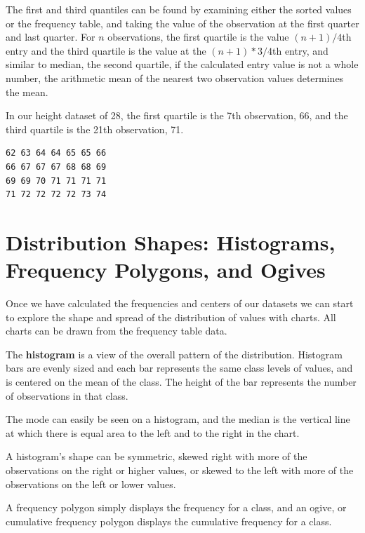 \documentclass[nohyper,justified]{tufte-handout}\usepackage[]{graphicx}\usepackage[]{color}
\makeatletter
\newenvironment{kframe}{%
 \def\at@end@of@kframe{}%
 \ifinner\ifhmode%
  \def\at@end@of@kframe{\end{minipage}}%
  \begin{minipage}{\columnwidth}%
 \fi\fi%
 \def\FrameCommand##1{\hskip\@totalleftmargin \hskip-\fboxsep
 \colorbox{shadecolor}{##1}\hskip-\fboxsep
     \hskip-\linewidth \hskip-\@totalleftmargin \hskip\columnwidth}%
 \MakeFramed {\advance\hsize-\width
   \@totalleftmargin\z@ \linewidth\hsize
   \@setminipage}}%
 {\par\unskip\endMakeFramed%
 \at@end@of@kframe}
\newenvironment{knitrout}{}{} %
\makeatother
\begin{document}
The first and third quantiles can be found by examining either the sorted values or the frequency table, and taking the value of the observation at the first quarter and last quarter. For $n$ observations, the first quartile is the value $(n+1)/4$th entry and the third quartile is the value at the $(n+1)*3/4$th entry, and similar to median, the second quartile, if the calculated entry value is not a whole number, the arithmetic mean of the nearest two observation values determines the mean.



In our height dataset of 28, the first quartile is the 7th observation, 66, and the third quartile is the 21th observation, 71.
\begin{knitrout}
\color{fgcolor}\begin{kframe}
\begin{verbatim}
62 63 64 64 65 65 66
66 67 67 67 68 68 69
69 69 70 71 71 71 71
71 72 72 72 72 73 74
\end{verbatim}
\end{kframe}
\end{knitrout}


\section{Distribution Shapes: Histograms, Frequency Polygons, and Ogives}

Once we have calculated the frequencies and centers of our datasets we can start to explore the shape and spread of the distribution of values with charts. All charts can be drawn from the frequency table data.

The \textbf{histogram} is a view of the overall pattern of the distribution. Histogram bars are evenly sized and each bar represents the same class levels of values, and is centered on the mean of the class. The height of the bar represents the number of observations in that class.

The mode can easily be seen on a histogram, and the median is the vertical line at which there is equal area to the left and to the right in the chart. 

A histogram's shape can be symmetric, skewed right with more of the observations on the right or higher values, or skewed to the left with more of the observations on the left or lower values.

A frequency polygon simply displays the frequency for a class, and an ogive, or cumulative frequency polygon displays the cumulative frequency for a class. 
\end{document}
